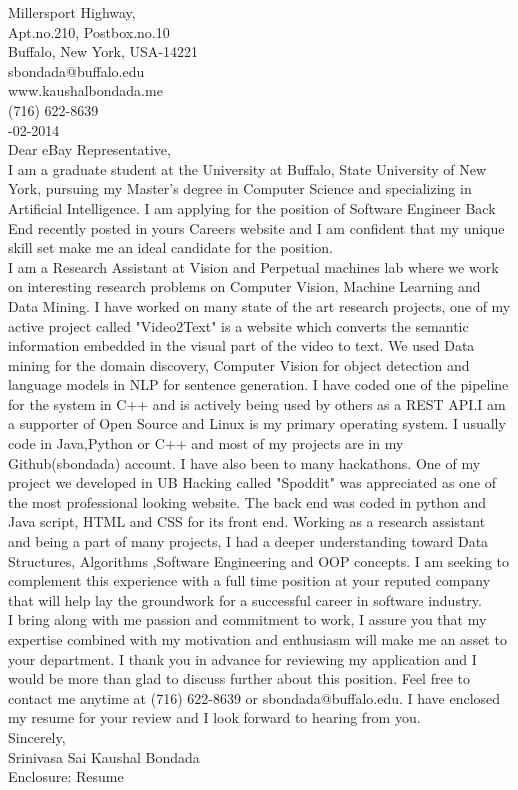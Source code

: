 \documentclass[10pt,letterpaper,oneside]{article}
\begin{document}
 Millersport Highway,\\
Apt.no.210, Postbox.no.10\\
Buffalo, New York, USA-14221\\
sbondada@buffalo.edu\\
www.kaushalbondada.me\\
(716) 622-8639\\

-02-2014\\
 
\noindent Dear eBay Representative,\\
 
I am a graduate student at the University at Buffalo, State University of New York, pursuing my Master's degree in Computer Science and
specializing in Artificial Intelligence. I am applying for the position of Software Engineer Back End recently posted in yours Careers website and I am confident that my unique skill set make me an ideal candidate for the position.\\

I am a Research Assistant at Vision and Perpetual machines lab where we work on interesting research problems on Computer
Vision, Machine Learning and Data Mining. I have worked on many state of the art research projects, one of my active project called
"Video2Text" is a website which converts the semantic information embedded in the visual part of the video to text. We used Data mining for the
domain discovery, Computer Vision for object detection and language models in NLP for sentence generation. I have coded one of the pipeline
for the system in C++ and is actively being used by others as a REST API.I am a supporter of Open Source and Linux is my primary operating
system. I usually code in Java,Python or C++ and most of my projects are in my Github(sbondada) account. I have also been to many hackathons.
One of my project we developed in UB Hacking called "Spoddit" was appreciated as one of the most professional looking website. The back end
was coded in python and Java script, HTML and CSS for its front end. Working as a research assistant and being a part of many projects, I
had a deeper understanding toward Data Structures, Algorithms ,Software Engineering and OOP concepts. I am seeking to complement this experience with a full time position at your reputed company that will help lay the groundwork for a successful career in software industry.\\

I bring along with me passion and commitment to work, I assure you that my expertise combined with my motivation
and enthusiasm will make me an asset to your department. I thank you in advance for reviewing my application and I would be more than glad to
discuss further about this position. Feel free to contact me anytime at (716) 622-8639 or sbondada@buffalo.edu. I have enclosed my resume for your review and I look forward to hearing from you.\\
 
\noindent Sincerely,\\
Srinivasa Sai Kaushal Bondada\\
Enclosure: Resume\\
\end{document}
